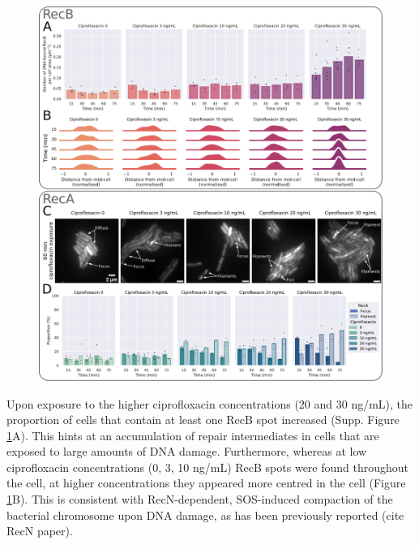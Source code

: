 \begin{figure}[htbp]
\begin{center}
\includegraphics[width=\textwidth]{Figures/Fig4_cipro_30ngmL.pdf}
\end{center}
\caption{}
\label{Fig:high_cipro}
\end{figure}


Upon exposure to the higher cipro\-floxacin concentrations (20 and 30 ng/mL), the proportion of cells that contain at least one RecB spot increased (Supp. Figure \ref{Fig:high_cipro}A). This hints at an accumulation of repair intermediates in cells that are exposed to large amounts of DNA damage. Furthermore, whereas at low ciprofloxacin concentrations (0, 3, 10 ng/mL) RecB spots were found throughout the cell, at higher concentrations they appeared more centred in the cell (Figure \ref{Fig:high_cipro}B). This is consistent with RecN-dependent, SOS-induced compaction of the bacterial chromosome upon DNA damage, as has been previously reported (cite RecN paper).

